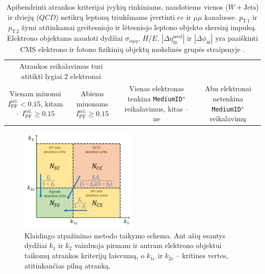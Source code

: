 \documentclass[a4paper, 12pt, oneside]{article}
\newcommand{\ttt}[1]{\texttt{#1}}
\newcommand{\WJets}{W\! +\!\mathrm{Jets}}
\newcommand{\ltq}[1]{{\quotedblbase{}#1\textquotedblleft{}}}
\newcommand{\QCD}{QC\! D}
\newlength\q
\begin{document}
\begin{table}[!b]
\begin{tabular}{|c|c|c|c|}
			\multicolumn{2}{c|}{\multirow{2}{19em}{\centering Atrankos reikalavimus turi atitikti lygiai 2 elektronai}} \\
		\multicolumn{2}{|c|}{ } & \multicolumn{2}{c|}{ } \\
		\hline
		\multirow{3}{9em}{\centering Vienam miuonui $I_{\mathrm{PF}}^{\mathrm{rel.}}<0.15$,
			kitam -- $I_{\mathrm{PF}}^{\mathrm{rel.}}\geqslant 0.15$} &
			\multirow{3}{7em}{\centering Abiems miuonams $I_{\mathrm{PF}}^{\mathrm{rel.}}\geqslant 0.15$} &
			\multirow{3}{10em}{\centering Vienas elektronas tenkina \ltq{\ttt{MediumID}} reikalavimus, kitas -- ne} &
			\multirow{3}{10em}{\centering Abu elektronai netenkina \ltq{\ttt{MediumID}} reikalavimų} \\
		 & & & \\
		 & & & \\
		\hline
	\end{tabular}
	\caption{\label{table:jetSelection} Apibendrinti atrankos kriterijai įvykių rinkiniams, naudotiems vienos ($\WJets$) ir
	dviejų ($\QCD$) netikrų leptonų triukšmams įvertinti $ee$ ir $\mu\mu$ kanaluose.
	$p_{\mathrm{T}\,1}$ ir $p_{\mathrm{T}\,2}$ žymi atitinkamai greitesniojo ir lėtesniojo leptono objekto skersinį impulsą.
	Elektrono objektams naudoti dydžiai $\sigma_{i\eta i\eta}$, $H/E$, $|\Delta\eta_{\mathrm{in}}^{\mathrm{seed}}|$ ir
	$|\Delta\phi_{\mathrm{in}}|$ yra paaiškinti CMS elektrono ir fotono fizikinių objektų mokslinės grupės straipsnyje \cite{EleID}.}
\end{table}


\begin{figure}[t!]
	\includegraphics[width=0.5\textwidth]{Magistrinis/FRschema.png}
	\vspace{-0.3cm}
	\caption{\label{fig:FRscheme}Klaidingo atpažinimo metodo taikymo schema.
	Ant ašių esantys dydžiai $k_1$ ir $k_2$ vaizduoja pirmam ir antram elektrono objektui taikomų atrankos
	kriterijų laisvumą, o $k_{1c}$ ir $k_{2c}$ -- kritines vertes, atitinkančias pilną atranką.}
\end{figure}
\end{document}
